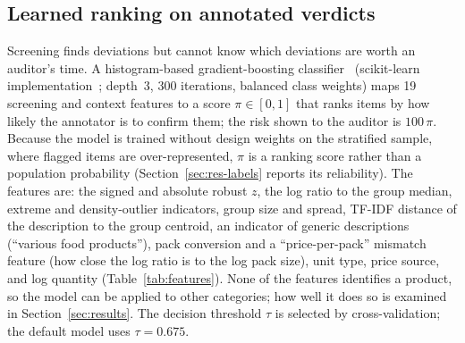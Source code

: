 \documentclass[conference]{IEEEtran}
\begin{document}
\subsection{Learned ranking on annotated verdicts}

Screening finds deviations but cannot know which deviations are worth an auditor's time. A
histogram-based gradient-boosting classifier~\cite{friedman2001gbm,ke2017lightgbm} (scikit-learn
implementation~\cite{pedregosa2011sklearn}; depth~3, 300 iterations, balanced class weights) maps 19
screening and context features to a score $\pi\in[0,1]$ that ranks items by how likely the annotator is to
confirm them; the risk shown to the auditor is $100\,\pi$. Because the model is trained without design
weights on the stratified sample, where flagged items are over-represented, $\pi$ is a ranking score rather
than a population probability (Section~\ref{sec:res-labels} reports its reliability). The features are: the signed and absolute robust $z$, the log ratio to the group median, extreme
and density-outlier indicators, group size and spread, TF-IDF distance of the description to the group
centroid, an indicator of generic descriptions (``various food products''), pack conversion and a
``price-per-pack'' mismatch feature (how close the log ratio is to the log pack size), unit type, price
source, and log quantity (Table~\ref{tab:features}). None of the features identifies a product, so the
model can be applied to other categories; how well it does so is examined in Section~\ref{sec:results}. The decision threshold $\tau$ is selected by cross-validation; the
default model uses $\tau=0.675$.
\end{document}
